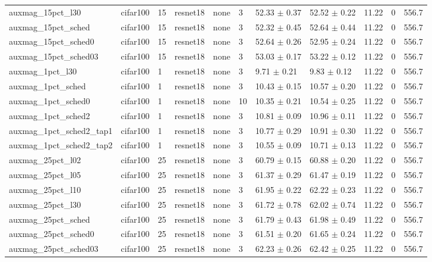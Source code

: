 \begin{tabular}{lllllllllll}
auxmag_15pct_l30 & cifar100 & 15 & resnet18 & none & 3 & 52.33 $\pm$ 0.37 & 52.52 $\pm$ 0.22 & 11.22 & 0 & 556.7 \\
auxmag_15pct_sched & cifar100 & 15 & resnet18 & none & 3 & 52.32 $\pm$ 0.45 & 52.64 $\pm$ 0.44 & 11.22 & 0 & 556.7 \\
auxmag_15pct_sched0 & cifar100 & 15 & resnet18 & none & 3 & 52.64 $\pm$ 0.26 & 52.95 $\pm$ 0.24 & 11.22 & 0 & 556.7 \\
auxmag_15pct_sched03 & cifar100 & 15 & resnet18 & none & 3 & 53.03 $\pm$ 0.17 & 53.22 $\pm$ 0.12 & 11.22 & 0 & 556.7 \\
auxmag_1pct_l30 & cifar100 & 1 & resnet18 & none & 3 & 9.71 $\pm$ 0.21 & 9.83 $\pm$ 0.12 & 11.22 & 0 & 556.7 \\
auxmag_1pct_sched & cifar100 & 1 & resnet18 & none & 3 & 10.43 $\pm$ 0.15 & 10.57 $\pm$ 0.20 & 11.22 & 0 & 556.7 \\
auxmag_1pct_sched0 & cifar100 & 1 & resnet18 & none & 10 & 10.35 $\pm$ 0.21 & 10.54 $\pm$ 0.25 & 11.22 & 0 & 556.7 \\
auxmag_1pct_sched2 & cifar100 & 1 & resnet18 & none & 3 & 10.81 $\pm$ 0.09 & 10.96 $\pm$ 0.11 & 11.22 & 0 & 556.7 \\
auxmag_1pct_sched2_tap1 & cifar100 & 1 & resnet18 & none & 3 & 10.77 $\pm$ 0.29 & 10.91 $\pm$ 0.30 & 11.22 & 0 & 556.7 \\
auxmag_1pct_sched2_tap2 & cifar100 & 1 & resnet18 & none & 3 & 10.55 $\pm$ 0.09 & 10.71 $\pm$ 0.13 & 11.22 & 0 & 556.7 \\
auxmag_25pct_l02 & cifar100 & 25 & resnet18 & none & 3 & 60.79 $\pm$ 0.15 & 60.88 $\pm$ 0.20 & 11.22 & 0 & 556.7 \\
auxmag_25pct_l05 & cifar100 & 25 & resnet18 & none & 3 & 61.37 $\pm$ 0.29 & 61.47 $\pm$ 0.19 & 11.22 & 0 & 556.7 \\
auxmag_25pct_l10 & cifar100 & 25 & resnet18 & none & 3 & 61.95 $\pm$ 0.22 & 62.22 $\pm$ 0.23 & 11.22 & 0 & 556.7 \\
auxmag_25pct_l30 & cifar100 & 25 & resnet18 & none & 3 & 61.72 $\pm$ 0.78 & 62.02 $\pm$ 0.74 & 11.22 & 0 & 556.7 \\
auxmag_25pct_sched & cifar100 & 25 & resnet18 & none & 3 & 61.79 $\pm$ 0.43 & 61.98 $\pm$ 0.49 & 11.22 & 0 & 556.7 \\
auxmag_25pct_sched0 & cifar100 & 25 & resnet18 & none & 3 & 61.51 $\pm$ 0.20 & 61.65 $\pm$ 0.24 & 11.22 & 0 & 556.7 \\
auxmag_25pct_sched03 & cifar100 & 25 & resnet18 & none & 3 & 62.23 $\pm$ 0.26 & 62.42 $\pm$ 0.25 & 11.22 & 0 & 556.7 \\

\end{tabular}

